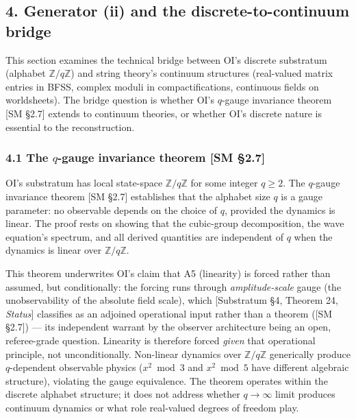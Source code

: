 \documentclass[
]{article}
\begin{document}
\hypertarget{generator-ii-and-the-discrete-to-continuum-bridge}{%
\subsection{4. Generator (ii) and the discrete-to-continuum
bridge}\label{generator-ii-and-the-discrete-to-continuum-bridge}}

This section examines the technical bridge between OI's discrete
substratum (alphabet \(\mathbb{Z}/q\mathbb{Z}\)) and string theory's
continuum structures (real-valued matrix entries in BFSS, complex moduli
in compactifications, continuous fields on worldsheets). The bridge
question is whether OI's \(q\)-gauge invariance theorem {[}SM §2.7{]}
extends to continuum theories, or whether OI's discrete nature is
essential to the reconstruction.

\hypertarget{the-q-gauge-invariance-theorem-sm-2.7}{%
\subsubsection{\texorpdfstring{4.1 The \(q\)-gauge invariance theorem
{[}SM
§2.7{]}}{4.1 The q-gauge invariance theorem {[}SM §2.7{]}}}\label{the-q-gauge-invariance-theorem-sm-2.7}}

OI's substratum has local state-space \(\mathbb{Z}/q\mathbb{Z}\) for
some integer \(q \geq 2\). The \(q\)-gauge invariance theorem {[}SM
§2.7{]} establishes that the alphabet size \(q\) is a gauge parameter:
no observable depends on the choice of \(q\), provided the dynamics is
linear. The proof rests on showing that the cubic-group decomposition,
the wave equation's spectrum, and all derived quantities are independent
of \(q\) when the dynamics is linear over \(\mathbb{Z}/q\mathbb{Z}\).

This theorem underwrites OI's claim that A5 (linearity) is forced rather
than assumed, but conditionally: the forcing runs through
\emph{amplitude-scale} gauge (the unobservability of the absolute field
scale), which {[}Substratum §4, Theorem 24, \emph{Status}{]} classifies
as an adjoined operational input rather than a theorem ({[}SM §2.7{]})
--- its independent warrant by the observer architecture being an open,
referee-grade question. Linearity is therefore forced \emph{given} that
operational principle, not unconditionally. Non-linear dynamics over
\(\mathbb{Z}/q\mathbb{Z}\) generically produce \(q\)-dependent
observable physics (\(x^2 \bmod 3\) and \(x^2 \bmod 5\) have different
algebraic structure), violating the gauge equivalence. The theorem
operates within the discrete alphabet structure; it does not address
whether \(q \to \infty\) limit produces continuum dynamics or what role
real-valued degrees of freedom play.
\end{document}

